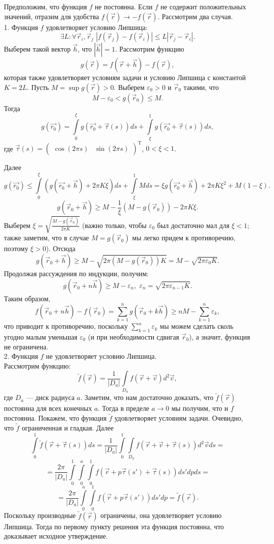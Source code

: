 \documentclass{article}
\begin{document}
Предположим, что функция $f$ не постоянна. Если $f$ не содержит положительных значений, отразим для удобства $f(\vec{r}) \to -f(\vec{r})$.
Рассмотрим два случая.\\
1. Функция $f$ удовлетворяет условию Липшица:
$$\exists L \colon \forall \vec{r}_i, \vec{r}_j \,\, |f(\vec{r}_j) - f(\vec{r}_i)| \leqslant L|\vec{r}_j - \vec{r}_i|.$$
Выберем такой вектор $\vec{h}$, что $|\vec{h}| = 1$. Рассмотрим функцию $$g(\vec{r}) = f(\vec{r} + \vec{h}) - f(\vec{r}),$$ которая также удовлетворяет условиям задачи и условию Липшица с константой $K=2L$. Пусть $M = \sup g(\vec{r}) > 0$. Выберем $\varepsilon_0 > 0$ и $\vec{r}_0$ такими, что
$$M - \varepsilon_0 < g(\vec{r}_0) \leqslant M.$$
Тогда
$$g(\vec{r_0}) = \int\limits_{0}^{\xi} g(\vec{r_0} + \vec{\tau} (s)) ds + \int\limits_{\xi}^{1} g(\vec{r_0} + \vec{\tau} (s)) ds,$$
где $\vec{\tau} (s) = (\begin{array}{cc} \cos (2\pi s) & \sin (2\pi s) \end{array})^\mathrm{T}$, $0 < \xi < 1$.

Далее
$$g(\vec{r_0}) \leqslant \int\limits_{0}^{\xi} (g(\vec{r_0} + \vec{h}) + 2\pi K\xi) ds + \int\limits_{\xi}^{1} M ds = \xi g(\vec{r_0} + \vec{h}) + 2\pi K\xi^2 + M(1-\xi).$$
$$g(\vec{r}_0 + \vec{h}) \geqslant M - \frac{1}{\xi} (M - g(\vec{r}_0)) - 2\pi K\xi.$$
Выберем $\xi = \sqrt{\frac{M - g(\vec{r}_0)}{2\pi K}}$ (важно только, чтобы $\varepsilon_0$ был достаточно мал для $\xi < 1$; также заметим, что в случае $M = g(\vec{r}_0)$ мы легко придем к противоречию, поэтому $\xi > 0$). Отсюда
$$g(\vec{r}_0 + \vec{h}) \geqslant M - \sqrt{2\pi (M - g(\vec{r}_0))K} = M - \sqrt{2\pi \varepsilon_0 K}.$$
Продолжая рассуждения по индукции, получим:
$$g(\vec{r}_0 + n\vec{h}) \geqslant M - \varepsilon_n,\,\, \varepsilon_{n} = \sqrt{2\pi \varepsilon_{n-1} K}.$$
Таким образом,
$$f(\vec{r}_0 + n\vec{h}) - f(\vec{r}_0) = \sum\limits_{k=1}^{n} g(\vec{r}_0 + k\vec{h}) \geqslant nM - \sum\limits_{k=1}^{n} \varepsilon_k,$$
что приводит к противоречию, поскольку $\sum\limits_{k=1}^{n} \varepsilon_k$ мы можем сделать сколь угодно малым уменьшая $\varepsilon_0$ (и при необходимости сдвигая $\vec{r}_0$), а значит, функция не ограничена.\\
2. Функция $f$ не удовлетворяет условию Липшица.\\
Рассмотрим функцию:
$$\tilde{f} (\vec{r}) = \frac{1}{|D_a|} \int\limits_{D_a} f(\vec{r} + \vec{v}) d^2\vec{v},$$
где $D_a$ --- диск радиуса $a$.
Заметим, что нам достаточно доказать, что $\tilde{f} (\vec{r})$ постоянна для всех конечных $a$. Тогда в пределе $a \to 0$ мы получим, что и $f$ постоянна. Покажем, что функция $\tilde{f}$ удовлетворяет условиям задачи. Очевидно, что $\tilde{f}$ ограниченная и гладкая. Далее
$$\int\limits_0^1 \tilde{f} (\vec{r} + \vec{\tau} (s)) ds = \frac{1}{|D_a|} \int\limits_0^1 \int\limits_{D_a} f(\vec{r} + \vec{v} + \vec{\tau} (s)) d^2\vec{v} ds =$$
$$= \frac{2\pi}{|D_a|} \int\limits_0^1 \int\limits_{0}^{a} \int\limits_{0}^1 f(\vec{r} + p\vec{\tau} (s') + \vec{\tau} (s)) ds' dp ds = $$
$$= \frac{2\pi}{|D_a|} \int\limits_{0}^{a} \int\limits_0^1 f(\vec{r} + p\vec{\tau} (s')) ds' dp = \tilde{f} (\vec{r}).$$
Поскольку производные $\tilde{f} (\vec{r})$ ограничены, она удовлетворяет условию Липшица. Тогда по первому пункту решения эта функция постоянна, что доказывает исходное утверждение.
\end{document}
